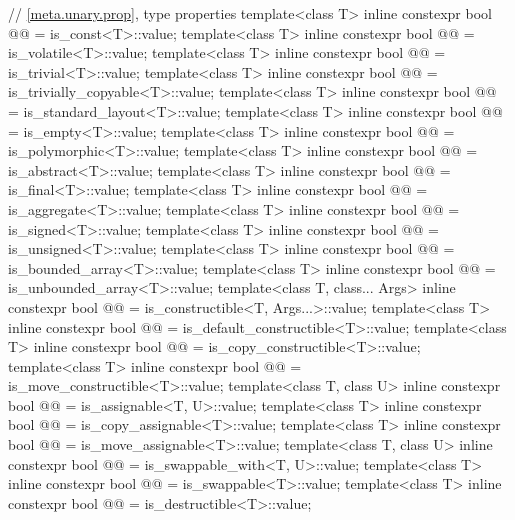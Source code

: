 \begin{codeblock}
{  // \ref{meta.unary.prop}, type properties
  template<class T>
    inline constexpr bool @@ = is_const<T>::value;
  template<class T>
    inline constexpr bool @@ = is_volatile<T>::value;
  template<class T>
    inline constexpr bool @@ = is_trivial<T>::value;
  template<class T>
    inline constexpr bool @@ = is_trivially_copyable<T>::value;
  template<class T>
    inline constexpr bool @@ = is_standard_layout<T>::value;
  template<class T>
    inline constexpr bool @@ = is_empty<T>::value;
  template<class T>
    inline constexpr bool @@ = is_polymorphic<T>::value;
  template<class T>
    inline constexpr bool @@ = is_abstract<T>::value;
  template<class T>
    inline constexpr bool @@ = is_final<T>::value;
  template<class T>
    inline constexpr bool @@ = is_aggregate<T>::value;
  template<class T>
    inline constexpr bool @@ = is_signed<T>::value;
  template<class T>
    inline constexpr bool @@ = is_unsigned<T>::value;
  template<class T>
    inline constexpr bool @@ = is_bounded_array<T>::value;
  template<class T>
    inline constexpr bool @@ = is_unbounded_array<T>::value;
  template<class T, class... Args>
    inline constexpr bool @@ = is_constructible<T, Args...>::value;
  template<class T>
    inline constexpr bool @@ = is_default_constructible<T>::value;
  template<class T>
    inline constexpr bool @@ = is_copy_constructible<T>::value;
  template<class T>
    inline constexpr bool @@ = is_move_constructible<T>::value;
  template<class T, class U>
    inline constexpr bool @@ = is_assignable<T, U>::value;
  template<class T>
    inline constexpr bool @@ = is_copy_assignable<T>::value;
  template<class T>
    inline constexpr bool @@ = is_move_assignable<T>::value;
  template<class T, class U>
    inline constexpr bool @@ = is_swappable_with<T, U>::value;
  template<class T>
    inline constexpr bool @@ = is_swappable<T>::value;
  template<class T>
    inline constexpr bool @@ = is_destructible<T>::value;
}
\end{codeblock}
